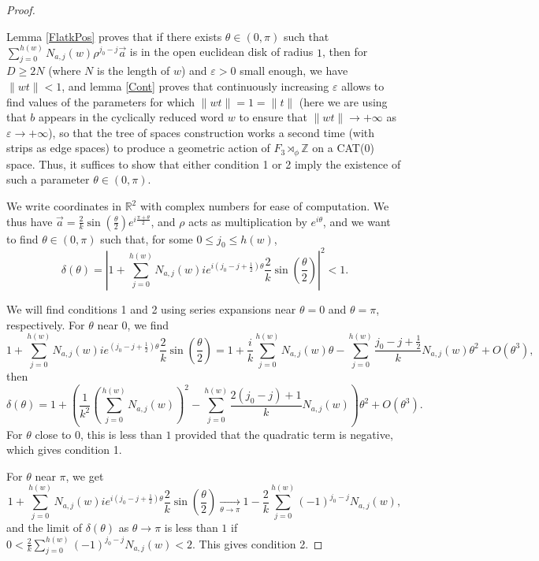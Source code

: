 \documentclass  [a4paper, 11pts] {article}
\newcommand{\R}{\mathbb{R}}
\newcommand{\Z}{\mathbb{Z}}
\newcommand{\eps}{\varepsilon}
\begin{document}
\begin{proof} ~

Lemma \ref{FlatkPos} proves that if there exists $\theta\in (0, \pi)$ such that $\sum_{j=0}^{h(w)}N_{a,j}(w)\rho^{j_0-j}\vec{a}$ is in the open euclidean disk of radius $1$, then for $D \ge 2N$ (where $N$ is the length of $w$) and $\eps > 0$ small enough, we have $\|wt\| < 1$, and lemma \ref{Cont} proves that continuously increasing $\eps$ allows to find values of the parameters for which $\|wt\| = 1 = \|t\|$ (here we are using that $b$ appears in the cyclically reduced word $w$ to ensure that $\|wt\|\longrightarrow +\infty$ as $\eps\longrightarrow +\infty$), so that the tree of spaces construction works a second time (with strips as edge spaces) to produce a geometric action of $F_3\rtimes_\phi\Z$ on a CAT(0) space. Thus, it suffices to show that either condition 1 or 2 imply the existence of such a parameter $\theta\in (0, \pi)$.


We write coordinates in $\R^2$ with complex numbers for ease of computation. We thus have $\vec{a} = \frac{2}{k}\sin(\frac{\theta}{2})e^{i\frac{\pi+\theta}{2}}$, and $\rho$ acts as multiplication by $e^{i\theta}$, and we want to find $\theta\in (0, \pi)$ such that, for some $0\le j_0\le h(w)$,
\[\delta(\theta) = \left|1 + \sum_{j=0}^{h(w)} N_{a,j}(w)ie^{i(j_0-j + \frac{1}{2})\theta}\frac{2}{k}\sin\left(\frac{\theta}{2}\right)\right|^2 < 1.\]

We will find conditions 1 and 2 using series expansions near $\theta=0$ and $\theta=\pi$, respectively. For $\theta$ near $0$, we find
\[1 + \sum_{j=0}^{h(w)} N_{a,j}(w)ie^{(j_0-j+\frac{1}{2})\theta}\frac{2}{k}\sin\left(\frac{\theta}{2}\right) = 1 + \frac{i}{k}\sum_{j=0}^{h(w)}N_{a,j}(w) \theta - \sum_{j=0}^{h(w)}\frac{j_0-j+\frac{1}{2}}{k}N_{a,j}(w)\theta^2 + O(\theta^3),\]
then
\[\delta(\theta) = 1 + \left(\frac{1}{k^2}\left(\sum_{j=0}^{h(w)} N_{a,j}(w)\right)^2 - \sum_{j=0}^{h(w)}\frac{2(j_0-j)+1}{k}N_{a,j}(w)\right)\theta^2 + O(\theta^3).\]
For $\theta$ close to $0$, this is less than $1$ provided that the quadratic term is negative, which gives condition 1.

For $\theta$ near $\pi$, we get
\[1 + \sum_{j=0}^{h(w)}N_{a,j}(w)ie^{i(j_0-j+\frac{1}{2})\theta}\frac{2}{k}\sin\left(\frac{\theta}{2}\right) \underset{\theta\longrightarrow \pi}{\longrightarrow} 1 - \frac{2}{k}\sum_{j=0}^{h(w)}(-1)^{j_0-j}N_{a,j}(w),\]
and the limit of $\delta(\theta)$ as $\theta\longrightarrow \pi$ is less than $1$ if $0 < \frac{2}{k}\sum_{j=0}^{h(w)}(-1)^{j_0-j}N_{a,j}(w) < 2$. 
This gives condition 2.

\end{proof}
\end{document}
